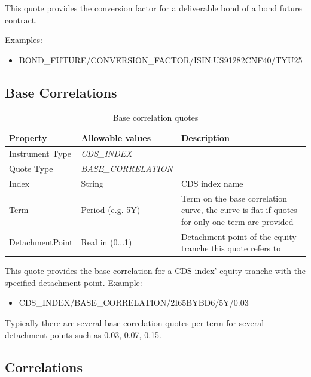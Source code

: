This quote provides the conversion factor for a deliverable bond of a bond future contract.

\medskip
Examples:
\begin{itemize}
	\item BOND\_FUTURE/CONVERSION\_FACTOR/ISIN:US91282CNF40/TYU25
\end{itemize}

\subsection{Base Correlations}

\begin{table}[H]
\centering
  \begin{tabular}{|p{3cm}|p{3.5cm}|p{7cm}|}
  \hline
  {\bf Property} & {\bf Allowable values} & {\bf Description} \\ \hline
    Instrument Type & \emph{CDS\_INDEX} & \\ \hline
    Quote Type & \emph{BASE\_CORRELATION} & \\ \hline
    Index & String & CDS index name \\ \hline
    Term & Period (e.g. 5Y) & Term on the base correlation curve, the curve is flat if quotes for only one term are provided\\ \hline
    DetachmentPoint & Real in (0...1) & Detachment point of the equity tranche this quote refers to \\ \hline
  \end{tabular}
  \caption{Base correlation quotes}
  \label{tab:base_correlation_quote}
\end{table}

This quote provides the base correlation for a CDS index' equity tranche with the specified detachment point.
\medskip
Example:
\begin{itemize}
	\item CDS\_INDEX/BASE\_CORRELATION/2I65BYBD6/5Y/0.03
\end{itemize}

Typically there are several base correlation quotes per term for several detachment points such as 0.03, 0.07, 0.15.

\subsection{Correlations}

